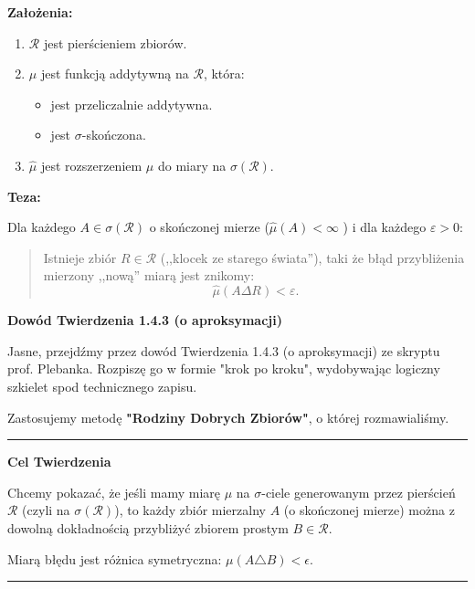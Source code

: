 \begin{theorem}[O aproksymacji.]
	\noindent \textbf{Założenia:} 
	\begin{enumerate}[label=\arabic*)]
		\item $\mathcal{R}$ jest pierścieniem zbiorów.
		\item $\mu$ jest funkcją addytywną na $\mathcal{R}$, która:
			\begin{itemize}
				\item jest przeliczalnie addytywna.
				\item jest $\sigma $-skończona.
			\end{itemize}
		\item $\hat{\mu}$ jest rozszerzeniem $\mu$ do miary na $\sigma\left( \mathcal{R} \right) $.
	\end{enumerate}
	\noindent \textbf{Teza:}

	Dla każdego $A\in \sigma \left( \mathcal{R} \right) $ o skończonej mierze ($\hat{\mu}\left( A \right) <\infty$ ) i dla każdego $\varepsilon > 0 $:
	\begin{quote}
		Istnieje zbiór $R\in \mathcal{R}$ (,,klocek ze starego świata''), taki że błąd przybliżenia mierzony ,,nową'' miarą jest znikomy:
		\[
		\hat{\mu}\left( A \Delta R \right) < \varepsilon 
		.\] 
	\end{quote} 

\end{theorem} 

\textbf{Dowód Twierdzenia 1.4.3 (o aproksymacji)}

Jasne, przejdźmy przez dowód Twierdzenia 1.4.3 (o aproksymacji) ze skryptu prof. Plebanka. Rozpiszę go w formie "krok po kroku", wydobywając logiczny szkielet spod technicznego zapisu.

Zastosujemy metodę \textbf{"Rodziny Dobrych Zbiorów"}, o której rozmawialiśmy.

\begin{center}
    \rule{0.5\textwidth}{0.4pt}
\end{center}

\textbf{Cel Twierdzenia}

Chcemy pokazać, że jeśli mamy miarę $\mu$ na $\sigma$-ciele generowanym przez pierścień $\mathcal{R}$ (czyli na $\sigma(\mathcal{R})$), to każdy zbiór mierzalny $A$ (o skończonej mierze) można z dowolną dokładnością przybliżyć zbiorem prostym $B \in \mathcal{R}$.

Miarą błędu jest różnica symetryczna: $\mu(A \triangle B) < \epsilon$.

\begin{center}
    \rule{0.5\textwidth}{0.4pt}
\end{center}

